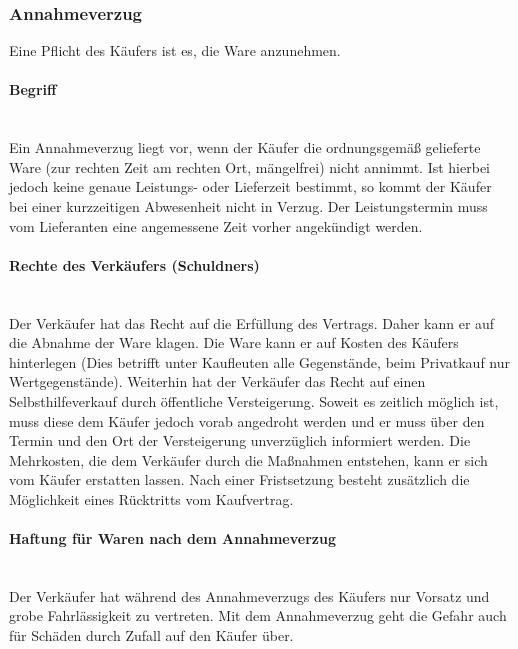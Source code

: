 		
\subsubsection{Annahmeverzug}
Eine Pflicht des Käufers ist es, die Ware anzunehmen.

\paragraph{Begriff}~\\
Ein Annahmeverzug liegt vor, wenn der Käufer die ordnungsgemäß gelieferte Ware (zur rechten Zeit am rechten Ort, mängelfrei) nicht annimmt. Ist hierbei jedoch keine genaue Leistungs- oder Lieferzeit bestimmt, so kommt der Käufer bei einer kurzzeitigen Abwesenheit nicht in Verzug. Der Leistungstermin muss vom Lieferanten eine angemessene Zeit vorher angekündigt werden.

\paragraph{Rechte des Verkäufers (Schuldners)}~\\
Der Verkäufer hat das Recht auf die Erfüllung des Vertrags. Daher kann er auf die Abnahme der Ware klagen. Die Ware kann er auf Kosten des Käufers hinterlegen (Dies betrifft unter Kaufleuten alle Gegenstände, beim Privatkauf nur Wertgegenstände). Weiterhin hat der Verkäufer das Recht auf einen Selbsthilfeverkauf durch öffentliche Versteigerung. Soweit es zeitlich möglich ist, muss diese dem Käufer jedoch vorab angedroht werden und er muss über den Termin und den Ort der Versteigerung unverzüglich informiert werden. Die Mehrkosten, die dem Verkäufer durch die Maßnahmen entstehen, kann er sich vom Käufer erstatten lassen. Nach einer Fristsetzung besteht zusätzlich die Möglichkeit eines Rücktritts vom Kaufvertrag.

\paragraph{Haftung für Waren nach dem Annahmeverzug}~\\
Der Verkäufer hat während des Annahmeverzugs des Käufers nur Vorsatz und grobe Fahrlässigkeit zu vertreten. Mit dem Annahmeverzug geht die Gefahr auch für Schäden durch Zufall auf den Käufer über.
	
